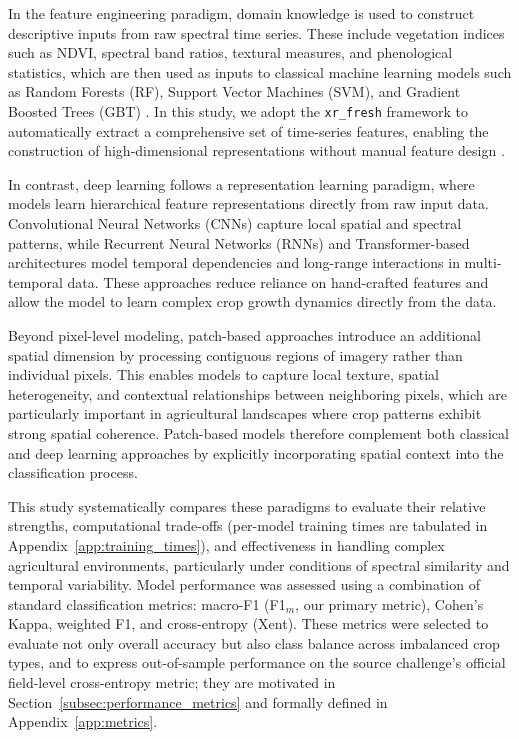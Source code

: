 \documentclass[pdflatex,sn-mathphys]{sn-jnl} %
\begin{document}
In the feature engineering paradigm, domain knowledge is used to construct descriptive inputs from raw spectral time series. These include vegetation indices such as NDVI, spectral band ratios, textural measures, and phenological statistics, which are then used as inputs to classical machine learning models such as Random Forests (RF), Support Vector Machines (SVM), and Gradient Boosted Trees (GBT) \cite{ieee2017}. In this study, we adopt the \texttt{xr\_fresh} framework to automatically extract a comprehensive set of time-series features, enabling the construction of high-dimensional representations without manual feature design \cite{mann2025}.

In contrast, deep learning follows a representation learning paradigm, where models learn hierarchical feature representations directly from raw input data. Convolutional Neural Networks (CNNs) capture local spatial and spectral patterns, while Recurrent Neural Networks (RNNs) \cite{acm2020} and Transformer-based architectures \cite{cropformer2023} model temporal dependencies and long-range interactions in multi-temporal data. These approaches reduce reliance on hand-crafted features and allow the model to learn complex crop growth dynamics directly from the data.

Beyond pixel-level modeling, patch-based approaches introduce an additional spatial dimension by processing contiguous regions of imagery rather than individual pixels. This enables models to capture local texture, spatial heterogeneity, and contextual relationships between neighboring pixels, which are particularly important in agricultural landscapes where crop patterns exhibit strong spatial coherence. Patch-based models therefore complement both classical and deep learning approaches by explicitly incorporating spatial context into the classification process.

This study systematically compares these paradigms to evaluate their relative strengths, computational trade-offs (per-model training times are tabulated in Appendix~\ref{app:training_times}), and effectiveness in handling complex agricultural environments, particularly under conditions of spectral similarity and temporal variability. Model performance was assessed using a combination of standard classification metrics: macro-F1 (F1$_m$, our primary metric), Cohen's Kappa, weighted F1, and cross-entropy (Xent). These metrics were selected to evaluate not only overall accuracy but also class balance across imbalanced crop types, and to express out-of-sample performance on the source challenge's official field-level cross-entropy metric; they are motivated in Section~\ref{subsec:performance_metrics} and formally defined in Appendix~\ref{app:metrics}.
\end{document}
